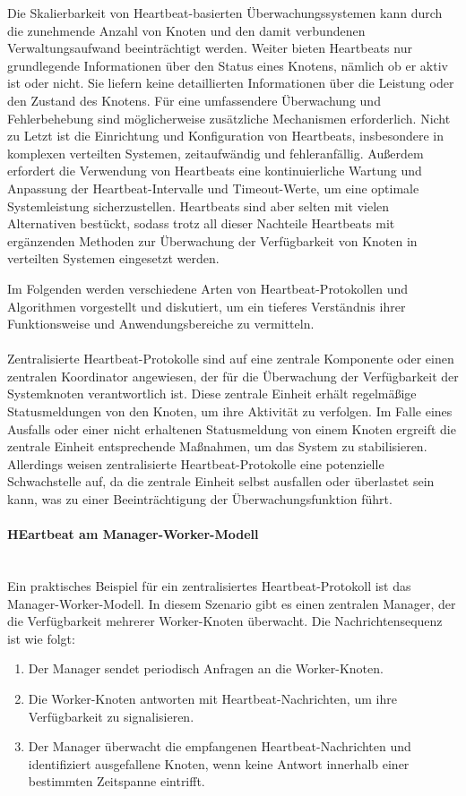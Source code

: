 \documentclass[../vs-script-first-v01.tex]{subfiles}
\begin{document}
Die Skalierbarkeit von Heartbeat-basierten Überwachungssystemen kann durch die zunehmende Anzahl von Knoten und den damit verbundenen Verwaltungsaufwand beeinträchtigt werden. Weiter bieten Heartbeats nur grundlegende Informationen über den Status eines Knotens, nämlich ob er aktiv ist oder nicht. Sie liefern keine detaillierten Informationen über die Leistung oder den Zustand des Knotens. Für eine umfassendere Überwachung und Fehlerbehebung sind möglicherweise zusätzliche Mechanismen erforderlich.
Nicht zu Letzt ist die  Einrichtung und Konfiguration von Heartbeats, insbesondere in komplexen verteilten Systemen, zeitaufwändig und fehleranfällig. Außerdem erfordert die Verwendung von Heartbeats eine kontinuierliche Wartung und Anpassung der Heartbeat-Intervalle und Timeout-Werte, um eine optimale Systemleistung sicherzustellen. 
Heartbeats sind aber selten mit vielen Alternativen bestückt, sodass trotz all dieser Nachteile Heartbeats mit ergänzenden Methoden zur Überwachung der Verfügbarkeit von Knoten in verteilten Systemen eingesetzt werden. 

Im Folgenden werden verschiedene Arten von Heartbeat-Protokollen und Algorithmen vorgestellt und diskutiert, um ein tieferes Verständnis ihrer Funktionsweise und Anwendungsbereiche zu vermitteln.
\\\\
Zentralisierte Heartbeat-Protokolle sind auf eine zentrale Komponente oder einen zentralen Koordinator angewiesen, der für die Überwachung der Verfügbarkeit der Systemknoten verantwortlich ist. Diese zentrale Einheit erhält regelmäßige Statusmeldungen von den Knoten, um ihre Aktivität zu verfolgen. Im Falle eines Ausfalls oder einer nicht erhaltenen Statusmeldung von einem Knoten ergreift die zentrale Einheit entsprechende Maßnahmen, um das System zu stabilisieren. Allerdings weisen zentralisierte Heartbeat-Protokolle eine potenzielle Schwachstelle auf, da die zentrale Einheit selbst ausfallen oder überlastet sein kann, was zu einer Beeinträchtigung der Überwachungsfunktion führt.
\paragraph{HEartbeat am Manager-Worker-Modell}\mbox{}\\
Ein praktisches Beispiel für ein zentralisiertes Heartbeat-Protokoll ist das Manager-Worker-Modell. In diesem Szenario gibt es einen zentralen Manager, der die Verfügbarkeit mehrerer Worker-Knoten überwacht. Die Nachrichtensequenz ist wie folgt:
\begin{enumerate}[label=(\alph*)]
\item Der Manager sendet periodisch Anfragen an die Worker-Knoten.
\item Die Worker-Knoten antworten mit Heartbeat-Nachrichten, um ihre Verfügbarkeit zu signalisieren.
\item Der Manager überwacht die empfangenen Heartbeat-Nachrichten und identifiziert ausgefallene Knoten, wenn keine Antwort innerhalb einer bestimmten Zeitspanne eintrifft.
\end{enumerate}
\end{document}
